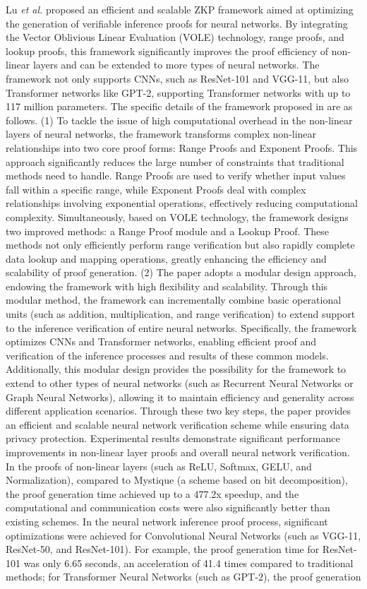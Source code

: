 \documentclass[journal]{IEEEtran}
\begin{document}
Lu \emph{et al.} \cite{lu2024efficient} proposed an efficient and scalable ZKP framework aimed at optimizing the generation of verifiable inference proofs for neural networks. By integrating the Vector Oblivious Linear Evaluation (VOLE) \cite{schoppmann2019distributed} technology, range proofs, and lookup proofs, this framework significantly improves the proof efficiency of non-linear layers and can be extended to more types of neural networks. The framework not only supports CNNs, such as ResNet-101 and VGG-11, but also Transformer networks like GPT-2, supporting Transformer networks with up to 117 million parameters. The specific details of the framework proposed in  \cite{lu2024efficient} are as follows. (1) To tackle the issue of high computational overhead in the non-linear layers of neural networks, the framework transforms complex non-linear relationships into two core proof forms: Range Proofs and Exponent Proofs. This approach significantly reduces the large number of constraints that traditional methods need to handle. Range Proofs are used to verify whether input values fall within a specific range, while Exponent Proofs deal with complex relationships involving exponential operations, effectively reducing computational complexity. Simultaneously, based on VOLE technology, the framework designs two improved methods: a Range Proof module and a Lookup Proof. These methods not only efficiently perform range verification but also rapidly complete data lookup and mapping operations, greatly enhancing the efficiency and scalability of proof generation. (2) The paper adopts a modular design approach, endowing the framework with high flexibility and scalability. Through this modular method, the framework can incrementally combine basic operational units (such as addition, multiplication, and range verification) to extend support to the inference verification of entire neural networks. Specifically, the framework optimizes CNNs and Transformer networks, enabling efficient proof and verification of the inference processes and results of these common models. Additionally, this modular design provides the possibility for the framework to extend to other types of neural networks (such as Recurrent Neural Networks or Graph Neural Networks), allowing it to maintain efficiency and generality across different application scenarios. Through these two key steps, the paper provides an efficient and scalable neural network verification scheme while ensuring data privacy protection. Experimental results demonstrate significant performance improvements in non-linear layer proofs and overall neural network verification. In the proofs of non-linear layers (such as ReLU, Softmax, GELU, and Normalization), compared to Mystique (a scheme based on bit decomposition), the proof generation time achieved up to a 477.2x speedup, and the computational and communication costs were also significantly better than existing schemes. In the neural network inference proof process, significant optimizations were achieved for Convolutional Neural Networks (such as VGG-11, ResNet-50, and ResNet-101). For example, the proof generation time for ResNet-101 was only 6.65 seconds, an acceleration of 41.4 times compared to traditional methods; for Transformer Neural Networks (such as GPT-2), the proof generation 
\end{document}
